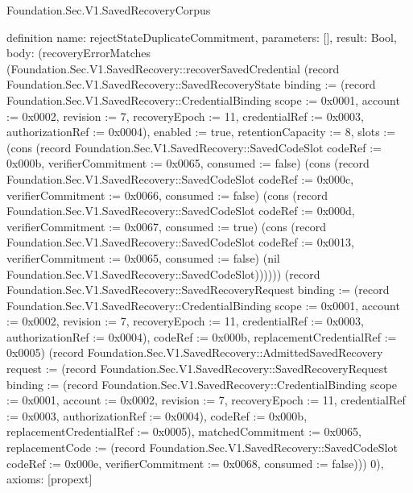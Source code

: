 \begin{lexlean}{Foundation.Sec.V1.SavedRecoveryCorpus}
\begin{semanticmodule}
definition{
  name: rejectStateDuplicateCommitment,
  parameters: [],
  result: Bool,
  body: (recoveryErrorMatches (Foundation.Sec.V1.SavedRecovery::recoverSavedCredential (record Foundation.Sec.V1.SavedRecovery::SavedRecoveryState {binding := (record Foundation.Sec.V1.SavedRecovery::CredentialBinding {scope := 0x0001, account := 0x0002, revision := 7, recoveryEpoch := 11, credentialRef := 0x0003, authorizationRef := 0x0004}), enabled := true, retentionCapacity := 8, slots := (cons (record Foundation.Sec.V1.SavedRecovery::SavedCodeSlot {codeRef := 0x000b, verifierCommitment := 0x0065, consumed := false}) (cons (record Foundation.Sec.V1.SavedRecovery::SavedCodeSlot {codeRef := 0x000c, verifierCommitment := 0x0066, consumed := false}) (cons (record Foundation.Sec.V1.SavedRecovery::SavedCodeSlot {codeRef := 0x000d, verifierCommitment := 0x0067, consumed := true}) (cons (record Foundation.Sec.V1.SavedRecovery::SavedCodeSlot {codeRef := 0x0013, verifierCommitment := 0x0065, consumed := false}) (nil Foundation.Sec.V1.SavedRecovery::SavedCodeSlot)))))}) (record Foundation.Sec.V1.SavedRecovery::SavedRecoveryRequest {binding := (record Foundation.Sec.V1.SavedRecovery::CredentialBinding {scope := 0x0001, account := 0x0002, revision := 7, recoveryEpoch := 11, credentialRef := 0x0003, authorizationRef := 0x0004}), codeRef := 0x000b, replacementCredentialRef := 0x0005}) (record Foundation.Sec.V1.SavedRecovery::AdmittedSavedRecovery {request := (record Foundation.Sec.V1.SavedRecovery::SavedRecoveryRequest {binding := (record Foundation.Sec.V1.SavedRecovery::CredentialBinding {scope := 0x0001, account := 0x0002, revision := 7, recoveryEpoch := 11, credentialRef := 0x0003, authorizationRef := 0x0004}), codeRef := 0x000b, replacementCredentialRef := 0x0005}), matchedCommitment := 0x0065, replacementCode := (record Foundation.Sec.V1.SavedRecovery::SavedCodeSlot {codeRef := 0x000e, verifierCommitment := 0x0068, consumed := false})})) 0),
  axioms: [propext]
}


\end{semanticmodule}
\end{lexlean}
